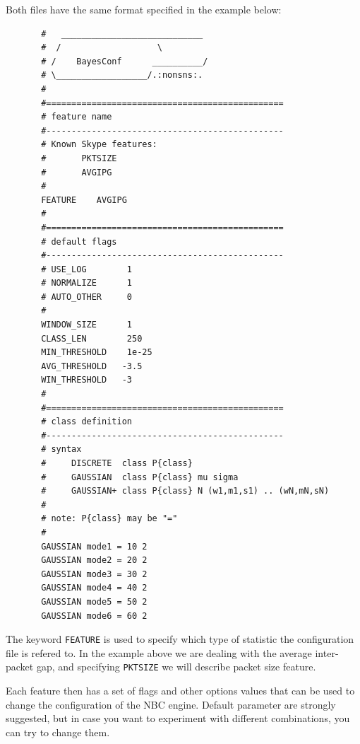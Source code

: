 \documentclass[11pt]{article}
\begin{document}
Both files have the same format specified in the example below:

\begin{small}\begin{verbatim}
       #   ____________________________  
       #  /                   \ 
       # /    BayesConf      __________/ 
       # \__________________/.:nonsns:.  
       #                   
       #===============================================
       # feature name
       #-----------------------------------------------
       # Known Skype features:
       #       PKTSIZE 
       #       AVGIPG
       #
       FEATURE    AVGIPG
       #
       #===============================================
       # default flags 
       #-----------------------------------------------
       # USE_LOG        1
       # NORMALIZE      1
       # AUTO_OTHER     0
       #
       WINDOW_SIZE      1
       CLASS_LEN        250
       MIN_THRESHOLD    1e-25
       AVG_THRESHOLD   -3.5
       WIN_THRESHOLD   -3
       #
       #===============================================
       # class definition
       #-----------------------------------------------
       # syntax
       #     DISCRETE  class P{class}
       #     GAUSSIAN  class P{class} mu sigma
       #     GAUSSIAN+ class P{class} N (w1,m1,s1) .. (wN,mN,sN)
       #
       # note: P{class} may be "="
       #
       GAUSSIAN mode1 = 10 2
       GAUSSIAN mode2 = 20 2
       GAUSSIAN mode3 = 30 2
       GAUSSIAN mode4 = 40 2
       GAUSSIAN mode5 = 50 2
       GAUSSIAN mode6 = 60 2
\end{verbatim}\end{small} \noindent
The keyword \texttt{FEATURE} is used to specify which type of statistic the configuration
file is refered to. In the example above we are dealing with the average inter-packet gap,
and specifying \texttt{PKTSIZE} we will describe packet size feature.



Each feature then has a set of flags and other options values that can be 
used to change the configuration of the NBC engine. Default parameter are strongly suggested, but in case
you want to experiment with different combinations, you can try to change them.
\end{document}
